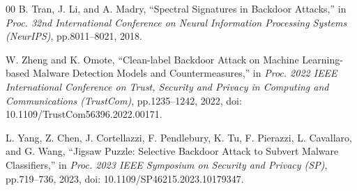 \begin{thebibliography}{00}
B. Tran, J. Li, and A. Madry,
``Spectral Signatures in Backdoor Attacks,''
in \textit{Proc. 32nd International Conference on Neural Information Processing Systems (NeurIPS)}, pp.8011--8021, 2018.

W. Zheng and K. Omote,
``Clean-label Backdoor Attack on Machine Learning-based Malware Detection Models and Countermeasures,''
in \textit{Proc. 2022 IEEE International Conference on Trust, Security and Privacy in Computing and Communications (TrustCom)}, pp.1235--1242, 2022,
doi: 10.1109/TrustCom56396.2022.00171.

L. Yang, Z. Chen, J. Cortellazzi, F. Pendlebury, K. Tu, F. Pierazzi, L. Cavallaro, and G. Wang,
``Jigsaw Puzzle: Selective Backdoor Attack to Subvert Malware Classifiers,''
in \textit{Proc. 2023 IEEE Symposium on Security and Privacy (SP)}, pp.719--736, 2023,
doi: 10.1109/SP46215.2023.10179347.

\end{thebibliography}